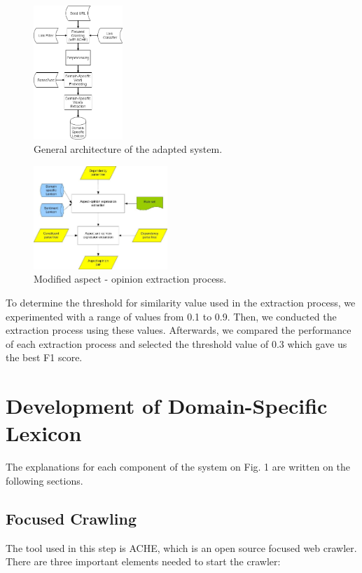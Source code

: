 \documentclass[a4paper,conference]{IEEEtran}
\begin{document}
\begin{figure}[htbp]
\centerline{\includegraphics[width=0.3\textwidth]{fig1.png}}
\caption{General architecture of the adapted system.}
\label{fig1}
\end{figure}

\begin{figure}[htbp]
\centerline{\includegraphics[width=0.45\textwidth]{fig2.jpg}}
\caption{Modified aspect - opinion extraction process.}
\label{fig2}
\end{figure}

To determine the threshold for similarity value used in the extraction process, we experimented with a range of values from 0.1 to 0.9. Then, we conducted the extraction process using these values. Afterwards, we compared the performance of each extraction process and selected the threshold value of 0.3 which gave us the best F1 score.

\section{Development of Domain-Specific Lexicon}
The explanations for each component of the system on Fig. 1 are written on the following sections.

\subsection{Focused Crawling}
The tool used in this step is ACHE, which is an open source focused web crawler. There are three important elements needed to start the crawler:
\end{document}
